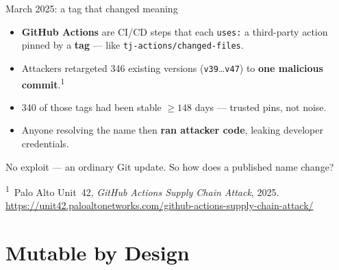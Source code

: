 \documentclass[aspectratio=169]{beamer}
\newcommand{\AttackTagMovesCount}{\num{346}\xspace}
\newcommand{\AttackStableDaysLowerBound}{\num{148}\xspace}
\newcommand{\AttackStableCases}{\num{340}\xspace}
\newcommand{\srcmark}{\textsuperscript{\scriptsize 1}}
\newcommand{\srcnote}[1]{%
  \vfill
  \begingroup
    \scriptsize\color{black!55}%
    \parbox{0.86\linewidth}{\raggedright\textsuperscript{1}~#1}\par
  \endgroup
}
\begin{document}
\begin{frame}{March 2025: a tag that changed meaning}

    \begingroup\footnotesize
    \begin{itemize}\setlength{\itemsep}{0.05em}
        \item \textbf{GitHub Actions} are CI/CD steps that each \texttt{uses:} a
              third-party action pinned by a \textbf{tag} --- like
              \texttt{tj-actions/changed-files}.
        \item Attackers retargeted \AttackTagMovesCount{} existing versions
              (\texttt{v39}\dots\texttt{v47}) to \textbf{one malicious commit}.\srcmark
        \item \AttackStableCases{} of those tags had been stable
              $\geq\AttackStableDaysLowerBound{}$ days --- trusted pins, not noise.
        \item Anyone resolving the name then \textbf{ran attacker code}, leaking
              developer credentials.
    \end{itemize}
    \endgroup
    \vspace{0.15em}
    \vspace{0.15em}
    {\footnotesize No exploit --- an ordinary Git update. So how does a published name change?}
    \srcnote{Palo Alto Unit~42, \emph{GitHub Actions Supply Chain Attack}, 2025.
    \url{https://unit42.paloaltonetworks.com/github-actions-supply-chain-attack/}}
\end{frame}

\section{Mutable by Design}
\end{document}
